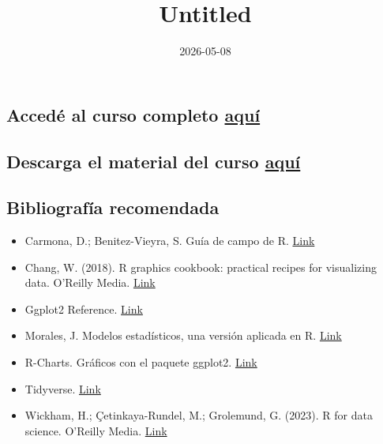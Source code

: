 \documentclass[
]{article}
\title{Untitled}
\author{}
\date{\vspace{-2.5em}2026-05-08}
\providecommand{\tightlist}{%
  \setlength{\itemsep}{0pt}\setlength{\parskip}{0pt}}
\begin{document}
\maketitle

\subsection*{\texorpdfstring{Accedé al curso completo
\href{curso_completo/curso_completo.qmd}{aquí}}{Accedé al curso completo aquí}}\label{acceduxe9-al-curso-completo-aquuxed}

\subsection*{\texorpdfstring{Descarga el material del curso
\href{https://github.com/andresblanco-unc/curso_graficos_ggplot_2026/raw/refs/heads/main/archivos_curso_ggplot_2026.rar}{aquí}}{Descarga el material del curso aquí}}\label{descarga-el-material-del-curso-aquuxed}

\subsection*{Bibliografía
recomendada}\label{bibliografuxeda-recomendada}

\begin{itemize}
\tightlist
\item
  Carmona, D.; Benitez-Vieyra, S. Guía de campo de R.
  \href{https://wiki.imbiv.unc.edu.ar/index.php?title=Guía_de_campo_de_R}{Link}
\item
  Chang, W. (2018). R graphics cookbook: practical recipes for
  visualizing data. O'Reilly Media.
  \href{http://www.cookbook-r.com/}{Link}
\item
  Ggplot2 Reference.
  \href{https://ggplot2.tidyverse.org/reference/}{Link}
\item
  Morales, J. Modelos estadísticos, una versión aplicada en R.
  \href{https://bookdown.org/j_morales/librostat/}{Link}
\item
  R-Charts. Gráficos con el paquete ggplot2.
  \href{https://r-charts.com/es/ggplot2/}{Link}
\item
  Tidyverse. \href{https://www.tidyverse.org/}{Link}
\item
  Wickham, H.; Çetinkaya-Rundel, M.; Grolemund, G. (2023). R for data
  science. O'Reilly Media. \href{https://r4ds.hadley.nz/}{Link}
\end{itemize}
\end{document}
